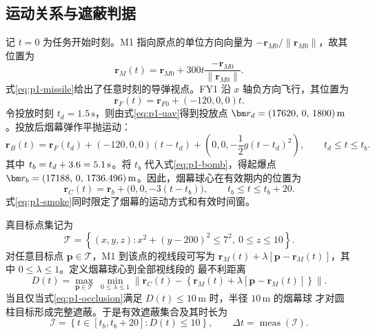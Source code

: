 \subsection{运动关系与遮蔽判据}

记 $t=0$ 为任务开始时刻。M1 指向原点的单位方向向量为
$-\bm r_{M0}/\lVert\bm r_{M0}\rVert$，故其位置为
\begin{equation}
  \bm r_M(t)=\bm r_{M0}+300t\frac{-\bm r_{M0}}{\lVert\bm r_{M0}\rVert}.
  \label{eq:p1-missile}
\end{equation}
式\eqref{eq:p1-missile}给出了任意时刻的导弹视点。FY1 沿 $x$ 轴负方向飞行，其位置为
\begin{equation}
  \bm r_F(t)=\bm r_{F0}+(-120,0,0)t.
  \label{eq:p1-uav}
\end{equation}
令投放时刻 $t_d=1.5\,\mathrm s$，则由式\eqref{eq:p1-uav}得到投放点
$\bm r_d=\PoneReleasePoint\,\mathrm m$。投放后烟幕弹作平抛运动：
\begin{equation}
  \bm r_B(t)=\bm r_F(t_d)+(-120,0,0)(t-t_d)
  +\left(0,0,-\frac{1}{2}g(t-t_d)^2\right),\qquad t_d\le t\le t_b .
  \label{eq:p1-bomb}
\end{equation}
其中 $t_b=t_d+3.6=5.1\,\mathrm s$。将 $t_b$ 代入式\eqref{eq:p1-bomb}，得起爆点
$\bm r_b=\PoneBurstPoint\,\mathrm m$。因此，烟幕球心在有效期内的位置为
\begin{equation}
  \bm r_C(t)=\bm r_b+\bigl(0,0,-3(t-t_b)\bigr),\qquad t_b\le t\le t_b+20 .
  \label{eq:p1-smoke}
\end{equation}
式\eqref{eq:p1-smoke}同时限定了烟幕的运动方式和有效时间窗。

真目标点集记为
\[
  \mathcal T=\left\{(x,y,z):x^2+(y-200)^2\le 7^2,\ 0\le z\le10\right\}.
\]
对任意目标点 $\bm p\in\mathcal T$，M1 到该点的视线段可写为
$\bm r_M(t)+\lambda[\bm p-\bm r_M(t)]$，其中 $0\le\lambda\le1$。定义烟幕球心到全部视线段的
最不利距离
\begin{equation}
  D(t)=\max_{\bm p\in\mathcal T}\ \min_{0\le\lambda\le1}
  \left\lVert\bm r_C(t)-\left\{\bm r_M(t)+\lambda[\bm p-\bm r_M(t)]\right\}\right\rVert .
  \label{eq:p1-occlusion}
\end{equation}
当且仅当式\eqref{eq:p1-occlusion}满足 $D(t)\le10\,\mathrm m$ 时，半径 $10\,\mathrm m$ 的烟幕球
才对圆柱目标形成完整遮蔽。于是有效遮蔽集合及其时长为
\begin{equation}
  \mathcal I=\left\{t\in[t_b,t_b+20]:D(t)\le10\right\},
  \qquad \Delta t=\operatorname{meas}(\mathcal I).
  \label{eq:p1-duration}
\end{equation}

